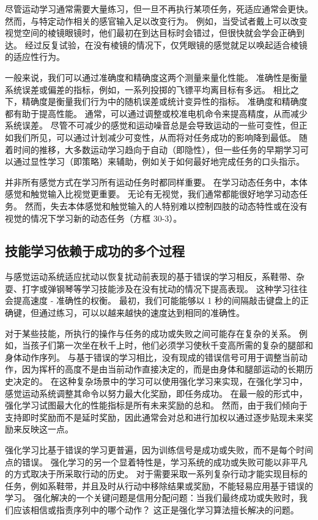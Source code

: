 尽管运动学习通常需要大量练习，但一旦不再执行某项任务，死适应通常会更快。 然而，与特定动作相关的感官输入足以改变行为。 例如，当受试者戴上可以改变视觉空间的棱镜眼镜时，他们最初在到达目标时会错过，但很快就会学会正确到达。 经过反复试验，在没有棱镜的情况下，仅凭眼镜的感觉就足以唤起适合棱镜的适应性行为。

一般来说，我们可以通过准确度和精确度这两个测量来量化性能。 准确性是衡量系统误差或偏差的指标，例如，一系列投掷的飞镖平均离目标有多远。 相比之下，精确度是衡量我们行为中的随机误差或统计变异性的指标。 准确度和精确度都有助于提高性能。 通常，可以通过调整或校准电机命令来提高精度，从而减少系统误差。 尽管不可减少的感觉和运动噪音总是会导致运动的一些可变性，但正如我们所见，可以通过计划减少可变性，从而将对任务成功的影响降到最低。 随着时间的推移，大多数运动学习趋向于自动（即隐性），但一些任务的早期学习可以通过显性学习（即策略）来辅助，例如关于如何最好地完成任务的口头指示。

并非所有感觉方式在学习所有运动任务时都同样重要。 在学习动态任务中，本体感觉和触觉输入比视觉更重要。 无论有无视觉，我们通常都能很好地学习动态任务。 然而，失去本体感觉和触觉输入的人特别难以控制四肢的动态特性或在没有视觉的情况下学习新的动态任务（方框 30-3）。



\subsection{技能学习依赖于成功的多个过程}
与感觉运动系统适应扰动以恢复扰动前表现的基于错误的学习相反，系鞋带、杂耍、打字或弹钢琴等学习技能涉及在没有扰动的情况下提高表现。 这种学习往往会提高速度 - 准确性的权衡。 最初，我们可能能够以 1 秒的间隔敲击键盘上的正确键，但通过练习，可以以越来越快的速度达到相同的准确性。

对于某些技能，所执行的操作与任务的成功或失败之间可能存在复杂的关系。 例如，当孩子们第一次坐在秋千上时，他们必须学习使秋千变高所需的复杂的腿部和身体动作序列。 与基于错误的学习相比，没有现成的错误信号可用于调整当前动作，因为挥杆的高度不是由当前动作直接决定的，而是由身体和腿部运动的长期历史决定的。 在这种复杂场景中的学习可以使用强化学习来实现，在强化学习中，感觉运动系统调整其命令以努力最大化奖励，即任务成功。 在最一般的形式中，强化学习试图最大化的性能指标是所有未来奖励的总和。 然而，由于我们倾向于支持即时奖励而不是延时奖励，因此通常会对总和进行加权以通过逐步贴现未来奖励来反映这一点。

强化学习比基于错误的学习更普遍，因为训练信号是成功或失败，而不是每个时间点的错误。 强化学习的另一个显着特性是，学习系统的成功或失败可能以非平凡的方式取决于所采取行动的历史。 对于需要采取一系列复杂行动才能实现目标的任务，例如系鞋带，并且及时从行动中移除结果或奖励，不能轻易应用基于错误的学习。 强化解决的一个关键问题是信用分配问题：当我们最终成功或失败时，我们应该相信或指责序列中的哪个动作？ 这正是强化学习算法擅长解决的问题。

